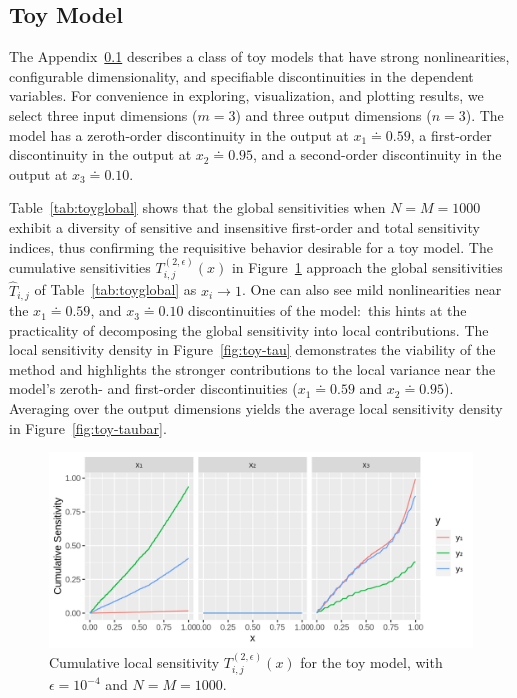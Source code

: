 \documentclass[12pt]{article}
\begin{document}
\subsection{Toy Model}
\label{sec:toy}

The Appendix~\ref{sec:toy} describes a class of toy models that have strong nonlinearities, configurable dimensionality, and specifiable discontinuities in the dependent variables. For convenience in exploring, visualization, and plotting results, we select three input dimensions ($m = 3$) and three output dimensions ($n = 3$). The model has a zeroth-order discontinuity in the output at $x_1 \doteq 0.59$, a first-order discontinuity in the output at $x_2 \doteq 0.95$, and a second-order discontinuity in the output at $x_3 \doteq 0.10$.

Table~\ref{tab:toyglobal} shows that the global sensitivities when $N = M = 1000$ exhibit a diversity of sensitive and insensitive first-order and total sensitivity indices, thus confirming the requisitive behavior desirable for a toy model. The cumulative sensitivities $T_{i,j}^{(2,\epsilon)}(x)$ in Figure~\ref{fig:toy-tx} approach the global sensitivities $\hat{T}_{i,j}$ of Table~\ref{tab:toyglobal} as $x_i \rightarrow 1$. One can also see mild nonlinearities near the $x_1 \doteq 0.59$, and $x_3 \doteq 0.10$ discontinuities of the model:\ this hints at the practicality of decomposing the global sensitivity into local contributions. The local sensitivity density in Figure~\ref{fig:toy-tau} demonstrates the viability of the method and highlights the stronger contributions to the local variance near the model's zeroth- and first-order discontinuities ($x_1 \doteq 0.59$ and $x_2 \doteq 0.95$). Averaging over the output dimensions yields the average local sensitivity density in Figure~\ref{fig:toy-taubar}.

\begin{figure}
    \centering
    \includegraphics[width=1.00\linewidth]{figures/toy-tx.png}
    \caption{Cumulative local sensitivity $T_{i,j}^{(2,\epsilon)}(x)$ for the toy model, with $\epsilon = 10^{-4}$ and $N = M = 1000$.}
    \label{fig:toy-tx}
\end{figure}
\end{document}
